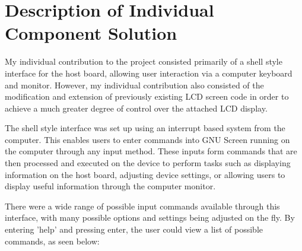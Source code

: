 \section{Description of Individual Component Solution}

My individual contribution to the project consisted primarily of a shell style 
interface for the host board, allowing user interaction via a computer keyboard 
and monitor. However, my individual contribution also consisted of the 
modification and extension of previously existing LCD screen code in order to 
achieve a much greater degree of control over the attached LCD display. 
\par\bigskip\noindent
The shell style interface was set up using an interrupt based system from the 
computer. This enables users to enter commands into GNU Screen running on 
the computer through any input method. These inputs form commands that are 
then processed and executed on the device to perform tasks such as displaying 
information on the host board, adjusting device settings, or allowing users 
to display useful information through the computer monitor.
\par\bigskip\noindent
There were a wide range of possible input commands available through this 
interface, with many possible options and settings being adjusted on the fly. 
By entering 'help' and pressing enter, the user could view a list of possible 
commands, as seen below: 

